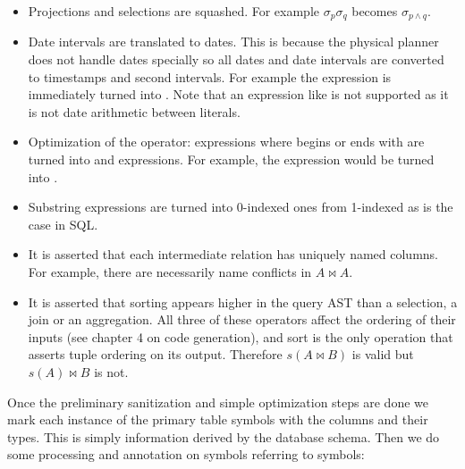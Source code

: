 \begin{itemize}
\item Projections and selections are squashed. For example
  \(\sigma_p\sigma_q\) becomes \(\sigma_{p \land q}\).
\item Date intervals are translated to dates. This is because the
  physical planner does not handle dates specially so all dates and
  date intervals are converted to timestamps and second intervals. For
  example the expression  is
  immediately turned into . Note that an
  expression like  is not
  supported as it is not date arithmetic between literals.
\item Optimization of the  operator:  expressions where 
  begins or ends with \sql{\%} are turned into  and
   expressions. For example, the expression  would be turned into .
\item Substring expressions are turned into 0-indexed ones from
  1-indexed as is the case in SQL.
\item It is asserted that each intermediate relation has uniquely
  named columns. For example, there are necessarily name conflicts in
  \(A \Join A\).
\item It is asserted that sorting appears higher in the query AST than a
  selection, a join or an aggregation. All three of these operators
  affect the ordering of their inputs (see chapter 4 on code
  generation), and sort is the only operation that asserts tuple
  ordering on its output. Therefore \(s(A \Join B)\) is valid but
  \(s(A) \Join B\) is not.
\end{itemize}

Once the preliminary sanitization and simple optimization steps are
done we mark each instance of the primary table symbols with the
columns and their types. This is simply information derived by the
database schema. Then we do some processing and annotation on symbols
referring to symbols:

